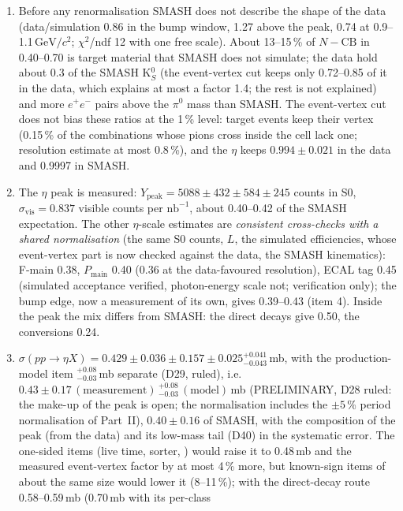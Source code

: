 \documentclass[11pt,a4paper]{article}
\newcommand{\piz}{\ensuremath{\pi^{0}}\xspace}
\newcommand{\ee}{\ensuremath{e^{+}e^{-}}\xspace}
\newcommand{\nbinv}{\ensuremath{\mathrm{nb}^{-1}}\xspace}
\newcommand{\GeVcc}{\ensuremath{\mathrm{GeV}/c^{2}}\xspace}
\newcommand{\code}[1]{\texttt{\detokenize{#1}}}
\newcommand{\Pmain}{\ensuremath{P_{\mathrm{main}}}\xspace}
\newcommand{\Ypeak}{\ensuremath{Y_{\mathrm{peak}}}\xspace}
\newcommand{\sigeta}{\ensuremath{\sigma(pp\to\eta X)}\xspace}
\begin{document}
\begin{enumerate}\setlength{\itemsep}{0pt}
\item Before any renormalisation SMASH does not describe the shape of the data (data/simulation 0.86 in the bump window, 1.27 above the
      peak, 0.74 at 0.9--1.1\,\GeVcc; $\chi^2$/ndf 12 with one free scale). About 13--15\,\% of $N-\mathrm{CB}$ in 0.40--0.70 is target material
      that SMASH does not simulate; the data hold about 0.3 of the SMASH K$^0_S$ (the event-vertex cut keeps only 0.72--0.85 of it in the data,
      which explains at most a factor 1.4; the rest is not explained) and more \ee pairs above the \piz mass than SMASH. The event-vertex cut
      does not bias these ratios at the 1\,\% level: target events keep their vertex (0.15\,\% of the combinations whose pions cross inside the cell lack
      one; resolution estimate at most 0.8\,\%), and the $\eta$ keeps $0.994\pm0.021$ in the data and 0.9997 in SMASH.
\item The $\eta$ peak is measured: $\Ypeak=5088\pm432\pm584\pm245$ counts in S0, $\sigma_{\mathrm{vis}}=0.837$ visible counts per \nbinv, about 0.40--0.42 of the SMASH
      expectation. The other $\eta$-scale estimates are \emph{consistent cross-checks with a shared normalisation} (the same S0 counts, $L$, the
      simulated efficiencies, whose event-vertex part is now checked against the data, the SMASH kinematics): F-main 0.38, \Pmain 0.40 (0.36 at the
      data-favoured resolution), ECAL tag 0.45 (simulated acceptance verified, photon-energy scale not; verification only); the bump edge, now a
      measurement of its own, gives 0.39--0.43 (item 4). Inside the peak the mix differs from SMASH: the direct decays give 0.50, the conversions 0.24.
\item \sigeta $=0.429\pm0.036\pm0.157\pm0.025^{+0.041}_{-0.043}$\,mb, with the production-model item $^{+0.08}_{-0.03}$\,mb separate (D29,
      ruled), i.e.\ $0.43\pm0.17\,(\mathrm{measurement})\,^{+0.08}_{-0.03}\,(\mathrm{model})$\,mb (PRELIMINARY, D28 ruled: the make-up of the peak is
      open; the normalisation includes the $\pm5$\,\% period
      normalisation of Part~II), $0.40\pm0.16$ of SMASH, with the composition of the peak (from the data) and its low-mass tail (D40) in the
      systematic error. The one-sided
      items (live time, sorter, \code{cor_ok}) would raise it to 0.48\,mb and the measured event-vertex factor by at most 4\,\% more, but
      known-sign items of about the same size would lower it (8--11\,\%); with the direct-decay route 0.58--0.59\,mb (0.70\,mb with its per-class

\end{enumerate}
\end{document}
